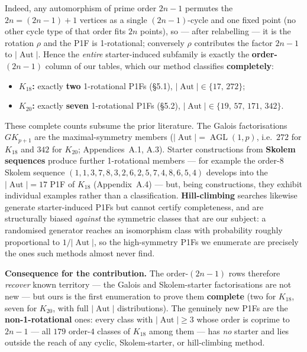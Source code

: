 \documentclass[11pt,reqno]{amsart}
\theoremstyle{plain}
\theoremstyle{definition}
\numberwithin{theorem}{section}
\newcommand{\Aut}{\operatorname{Aut}}
\newcommand{\AGL}{\operatorname{AGL}}
\begin{document}
Indeed, any automorphism of prime order $2n-1$ permutes the $2n=(2n-1)+1$ vertices as a single
$(2n-1)$-cycle and one fixed point (no other cycle type of that order fits $2n$ points), so ---
after relabelling --- it is the rotation $\rho$ and the P1F is 1-rotational; conversely $\rho$
contributes the factor $2n-1$ to $|\Aut|$. Hence the \emph{entire} starter-induced subfamily
is exactly the \textbf{order-$(2n-1)$} column of our tables, which our method classifies
\textbf{completely}:
\begin{itemize}
\item \textbf{$K_{18}$:} exactly \textbf{two} 1-rotational P1Fs (\S5.1), $|\Aut|\in\{17,\,272\}$;
\item \textbf{$K_{20}$:} exactly \textbf{seven} 1-rotational P1Fs (\S5.2),
$|\Aut|\in\{19,\,57,\,171,\,342\}$.
\end{itemize}

These complete counts subsume the prior literature. The Galois factorisations $GK_{p+1}$ are the
maximal-symmetry members ($|\Aut|=\AGL(1,p)$, i.e.\ $272$ for $K_{18}$ and $342$
for $K_{20}$; Appendices~A.1, A.3). Starter constructions from \textbf{Skolem sequences}
\cite{PikeShalaby,Pike} produce further 1-rotational members --- for example the order-$8$ Skolem
sequence $(1,1,3,7,8,3,2,6,2,5,7,4,8,6,5,4)$ develops into the $|\Aut|=17$ P1F of
$K_{18}$ (Appendix~A.4) --- but, being constructions, they exhibit individual examples rather than
a classification. \textbf{Hill-climbing} searches \cite{DinitzStinson} likewise generate starter-induced
P1Fs but cannot certify completeness, and are structurally biased \emph{against} the symmetric classes
that are our subject: a randomised generator reaches an isomorphism class with probability
roughly proportional to $1/|\Aut|$, so the high-symmetry P1Fs we enumerate are precisely
the ones such methods almost never find.

\medskip
\noindent\textbf{Consequence for the contribution.} The order-$(2n-1)$ rows therefore \emph{recover} known
territory --- the Galois and Skolem-starter factorisations are not new --- but ours is the first
enumeration to prove them \textbf{complete} (two for $K_{18}$, seven for $K_{20}$, with full
$|\Aut|$ distributions). The genuinely new P1Fs are the \textbf{non-1-rotational} ones: every
class with $|\Aut|\ge3$ whose order is coprime to $2n-1$ --- all $179$ order-$4$ classes of
$K_{18}$ among them --- has \emph{no} starter and lies outside the reach of any cyclic, Skolem-starter,
or hill-climbing method.
\end{document}
